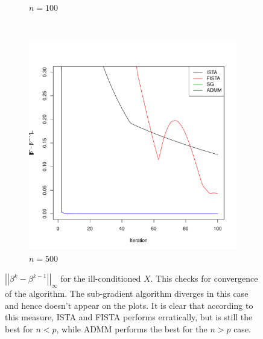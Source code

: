 \documentclass[12pt, leqno]{article}
\newcommand{\norm}[1]{\left|\left|#1\right|\right|}
\theoremstyle{remark}
\begin{document}
\begin{figure}[H]
\begin{subfigure}[b]{0.4\textwidth}
        \caption{$n=100$}
        \label{fig:100}
    \end{subfigure}
~
    \begin{subfigure}[b]{0.4\textwidth}
        \includegraphics[width=\textwidth]{500cvgc-cn.pdf}
        \caption{$n=500$}
        \label{fig:500}
    \end{subfigure}
\caption{$\norm{\beta^{k}-\beta^{k-1}}_{\infty}$ for the ill-conditioned $X$. This checks for convergence of the algorithm. The sub-gradient algorithm diverges in this case and hence doesn't appear on the plots. It is clear that according to this measure, ISTA and FISTA performs erratically, but is still the best for $n<p$, while ADMM performs the best for the $n>p$ case.}
\label{fig:cvgccn}
\end{figure}
\end{document}
